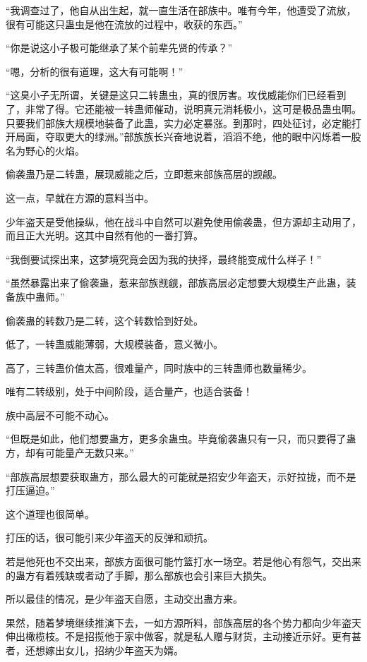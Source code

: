 \begin{this_body}
“我调查过了，他自从出生起，就一直生活在部族中。唯有今年，他遭受了流放，很有可能这只蛊虫是他在流放的过程中，收获的东西。”

“你是说这小子极可能继承了某个前辈先贤的传承？”

“嗯，分析的很有道理，这大有可能啊！”

“这臭小子无所谓，关键是这只二转蛊虫，真的很厉害。攻伐威能你们已经看到了，非常了得。它还能被一转蛊师催动，说明真元消耗极小，这可是极品蛊虫啊。只要我们部族大规模地装备了此蛊，实力必定暴涨。到那时，四处征讨，必定能打开局面，夺取更大的绿洲。”部族族长兴奋地说着，滔滔不绝，他的眼中闪烁着一股名为野心的火焰。

偷袭蛊乃是二转蛊，展现威能之后，立即惹来部族高层的觊觎。

这一点，早就在方源的意料当中。

少年盗天是受他操纵，他在战斗中自然可以避免使用偷袭蛊，但方源却主动用了，而且正大光明。这其中自然有他的一番打算。

“我倒要试探出来，这梦境究竟会因为我的抉择，最终能变成什么样子！”

“虽然暴露出来了偷袭蛊，惹来部族觊觎，部族高层必定想要大规模生产此蛊，装备族中蛊师。”

偷袭蛊的转数乃是二转，这个转数恰到好处。

低了，一转蛊威能薄弱，大规模装备，意义微小。

高了，三转蛊价值太高，很难量产，同时族中的三转蛊师也数量稀少。

唯有二转级别，处于中间阶段，适合量产，也适合装备！

族中高层不可能不动心。

“但既是如此，他们想要蛊方，更多余蛊虫。毕竟偷袭蛊只有一只，而只要得了蛊方，却有可能量产无数只来。”

“部族高层想要获取蛊方，那么最大的可能就是招安少年盗天，示好拉拢，而不是打压逼迫。”

这个道理也很简单。

打压的话，很可能引来少年盗天的反弹和顽抗。

若是他死也不交出来，部族方面很可能竹篮打水一场空。若是他心有怨气，交出来的蛊方有着残缺或者动了手脚，那么部族也会引来巨大损失。

所以最佳的情况，是少年盗天自愿，主动交出蛊方来。

果然，随着梦境继续推演下去，一如方源所料，部族高层的各个势力都向少年盗天伸出橄榄枝。不是招揽他于家中做客，就是私人赠与财货，主动接近示好。更有甚者，还想嫁出女儿，招纳少年盗天为婿。


\end{this_body}
